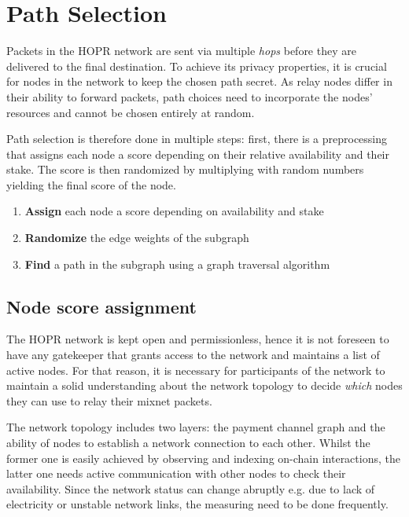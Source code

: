 \setlength{\parindent}{0pt}

\section{Path Selection}
\label{sec:path-selection}

Packets in the HOPR network are sent via multiple \textit{hops} before they are delivered to the final destination. To achieve its privacy properties, it is crucial for nodes in the network to keep the chosen path secret. As relay nodes differ in their ability to forward packets, path choices need to incorporate the nodes' resources and cannot be chosen entirely at random.

Path selection is therefore done in multiple steps: first, there is a preprocessing that assigns each node a score depending on their relative availability and their stake. The score is then randomized by multiplying with random numbers yielding the final score of the node.

\begin{enumerate}
    \item \textbf{Assign} each node a score depending on availability and stake
    \item \textbf{Randomize} the edge weights of the subgraph
    \item \textbf{Find} a path in the subgraph using a graph traversal algorithm
\end{enumerate}

\subsection{Node score assignment}
\label{sec:path-selection:node-score}

The HOPR network is kept open and permissionless, hence it is not foreseen to have any gatekeeper that grants access to the network and maintains a list of active nodes. For that reason, it is necessary for participants of the network to maintain a solid understanding about the network topology to decide \textit{which} nodes they can use to relay their mixnet packets.

The network topology includes two layers: the payment channel graph and the ability of nodes to establish a network connection to each other. Whilst the former one is easily achieved by observing and indexing on-chain interactions, the latter one needs active communication with other nodes to check their availability. Since the network status can change abruptly e.g. due to lack of electricity or unstable network links, the measuring need to be done frequently.

